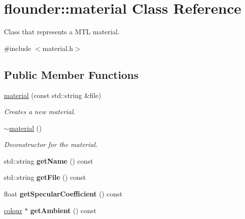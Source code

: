 \hypertarget{classflounder_1_1material}{}\section{flounder\+:\+:material Class Reference}
\label{classflounder_1_1material}


Class that represents a M\+TL material.  




{\ttfamily \#include $<$material.\+h$>$}

\subsection*{Public Member Functions}
\begin{DoxyCompactItemize}
\item 
\hyperlink{classflounder_1_1material_a92098b1119ad0fa59ca131410cbaf762}{material} (const std\+::string \&file)
\begin{DoxyCompactList}\small\item\em Creates a new material. \end{DoxyCompactList}\item 
\hyperlink{classflounder_1_1material_a9091fb3ad0368b98413568ccef5dbdb7}{$\sim$material} ()
\begin{DoxyCompactList}\small\item\em Deconstructor for the material. \end{DoxyCompactList}\item 
\mbox{\label{classflounder_1_1material_ad1a00236b517a42246066c11f6214fb5}} 
std\+::string {\bfseries get\+Name} () const
\item 
\mbox{\label{classflounder_1_1material_a20d6eeae2a75e2543270c7866b8eaf09}} 
std\+::string {\bfseries get\+File} () const
\item 
\mbox{\label{classflounder_1_1material_a7a1b1ba51cd46c2f9c0d766d3ecc8b2b}} 
float {\bfseries get\+Specular\+Coefficient} () const
\item 
\mbox{\label{classflounder_1_1material_afa55b7a69b762d306a20068ef612d59e}} 
\hyperlink{classflounder_1_1colour}{colour} $\ast$ {\bfseries get\+Ambient} () const
\item 

\end{DoxyCompactItemize}

